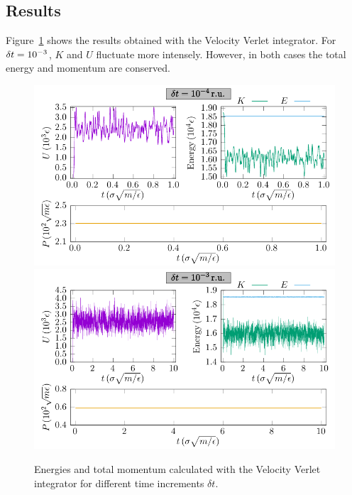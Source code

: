 \documentclass{article}
\begin{document}
  \subsection{Results}

  Figure~\ref{fig:vel_verlet} shows the results obtained with the Velocity Verlet integrator. For \(\delta t=10^{-3}\), \(K\) and \(U\) fluctuate more intensely. However, in both cases the total energy and momentum are conserved.
  \begin{figure}[htb]
    \centering
        \includegraphics[width=\linewidth]{../figures/vel_verlet_energies_01.pdf}
    \endminipage%
        \includegraphics[width=\linewidth]{../figures/vel_verlet_energies_02.pdf}
    \endminipage
    \caption{Energies and total momentum calculated with the Velocity Verlet integrator for different time increments \(\delta t\).}\label{fig:vel_verlet}
  \end{figure}
\end{document}
